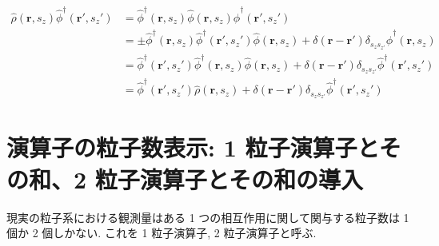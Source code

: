 \documentclass[uplatex,dvipdfmx,a4paper,11pt]{jlreq}
\newcommand{\rr}{\bm{r}}
\numberwithin{equation}{section}
\theoremstyle{definition}
\begin{document}
\begin{align}
  \hat{\rho}(\rr, s_z)\hat{\phi}^\dagger(\rr', s_z') & = \hat{\phi}^\dagger(\rr, s_z)\hat{\phi}(\rr, s_z)\hat{\phi}^\dagger(\rr', s_z')                                                                       \\
                                                     & = \pm\hat{\phi}^\dagger(\rr, s_z)\hat{\phi}^\dagger(\rr', s_z')\hat{\phi}(\rr, s_z) + \delta(\rr - \rr')\delta_{s_zs_{z'}}\hat{\phi}^\dagger(\rr, s_z) \\
                                                     & = \hat{\phi}^\dagger(\rr', s_z')\hat{\phi}^\dagger(\rr, s_z)\hat{\phi}(\rr, s_z) + \delta(\rr - \rr')\delta_{s_zs_{z'}}\hat{\phi}^\dagger(\rr', s_z')  \\
                                                     & = \hat{\phi}^\dagger(\rr', s_z')\hat{\rho}(\rr, s_z) + \delta(\rr - \rr')\delta_{s_zs_{z'}}\hat{\phi}^\dagger(\rr', s_z')
\end{align}

\section{演算子の粒子数表示: 1 粒子演算子とその和、2 粒子演算子とその和の導入}
現実の粒子系における観測量はある 1 つの相互作用に関して関与する粒子数は 1 個か 2 個しかない. これを 1 粒子演算子, 2 粒子演算子と呼ぶ.
\end{document}
